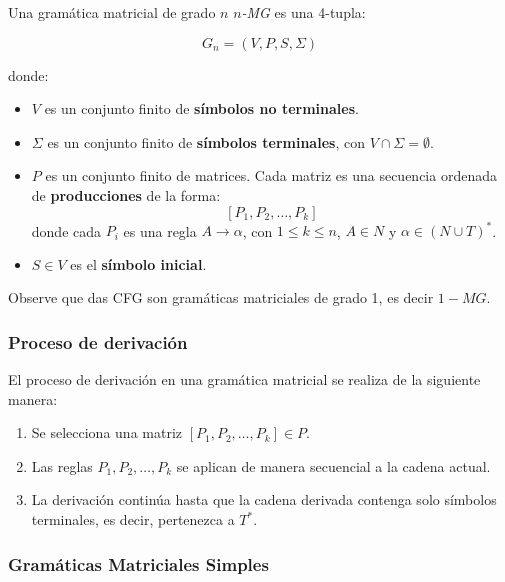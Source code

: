 \documentclass{article}
\begin{document}
Una gramática matricial de grado $n$ \textit{$n$-MG} es una 4-tupla:

\[
      G_n = (V, P, S,\Sigma)
\]

donde:
\begin{itemize}
      \item \( V \) es un conjunto finito de \textbf{símbolos no terminales}.
      \item \( \Sigma \) es un conjunto finito de \textbf{símbolos terminales}, con \( V \cap \Sigma = \emptyset \).
      \item \( P \) es un conjunto finito de matrices. Cada matriz es una secuencia ordenada de \textbf{producciones} de la forma:
            \[
                  [P_1, P_2, \dots, P_k]
            \]
            donde cada \( P_i \) es una regla \( A \to \alpha \), con $1\leq k\leq n$, \( A \in N \) y \( \alpha \in (N \cup T)^* \).
      \item \( S \in V \) es el \textbf{símbolo inicial}.
\end{itemize}

Observe que das CFG son gramáticas matriciales de grado 1, es decir $1-MG$.

\subsubsection{Proceso de derivación}

El proceso de derivación en una gramática matricial se realiza de la siguiente manera:
\begin{enumerate}
      \item Se selecciona una matriz \( [P_1, P_2, \dots, P_k] \in P \).
      \item Las reglas \( P_1, P_2, \dots, P_k \) se aplican de manera secuencial a la cadena actual.
      \item La derivación continúa hasta que la cadena derivada contenga solo símbolos terminales, es decir, pertenezca a \( T^* \).
\end{enumerate}

\subsubsection{Gramáticas Matriciales Simples}
\end{document}
